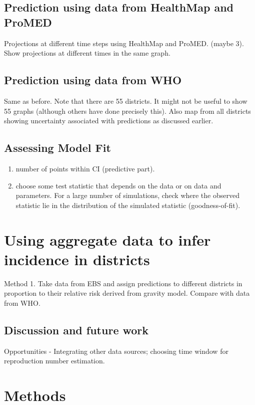 \documentclass[a4paper,12pt]{article}
\begin{document}
 \subsection{Prediction using data from HealthMap and ProMED}
 Projections at different time steps using HealthMap and
 ProMED. (maybe 3).
 Show projections at different times in the same graph.

 \subsection{Prediction using data from WHO}
 Same as before. Note that there are 55 districts. It might not be
 useful to show 55 graphs (although others have done precisely this). 
 Also map from all districts showing uncertainty
 associated with predictions as discussed earlier.

 \subsection{Assessing Model Fit}
 \begin{enumerate}
 \item number of points within CI (predictive part).
 \item choose some test statistic that depends on the data or on data
   and parameters. For a large number of simulations, check where the
   observed statistic lie in the distribution of the simulated statistic (goodness-of-fit).
 \end{enumerate}
 
 \section{Using aggregate data to infer incidence in districts}

 Method 1. Take data from EBS and assign predictions to different
 districts in proportion to their relative risk derived from gravity
 model. Compare with data from WHO.

 \subsection{Discussion and future work}

 Opportunities - Integrating other data sources; choosing time
 window for reproduction number estimation.

 \section{Methods}
\end{document}
